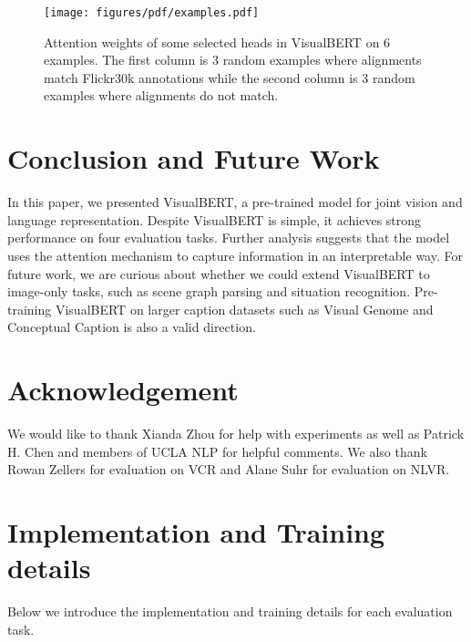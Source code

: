 \documentclass{article} \usepackage{iclr2019_conference,times}
\newcommand{\model}{VisualBERT\xspace}
\newcommand{\nlvr}{NLVR\xspace}
\begin{document}
\begin{figure} [h]
\centering
\vspace{-20pt}
\texttt{[image: figures/pdf/examples.pdf]}
\caption{Attention weights of some selected heads in \model on 6 examples. The first column is 3 random examples where alignments match Flickr30k annotations while the second column is 3 random examples where alignments do not match. }
\label{fig:examples}
\end{figure}
 
\section{Conclusion and Future Work}
In this paper, we presented \model, a pre-trained model for joint vision and language representation. Despite \model is simple, it achieves strong performance on four evaluation tasks. Further analysis suggests that the model uses the attention mechanism to capture information in an interpretable way. For future work, we are curious about whether we could extend \model to image-only tasks, such as scene graph parsing and situation recognition.  Pre-training \model on larger caption datasets such as Visual Genome and Conceptual Caption is also a valid direction.

\section*{Acknowledgement}
We would like to thank Xianda Zhou for help with experiments as well as Patrick H. Chen and members of UCLA NLP for helpful comments. We also thank Rowan Zellers for evaluation on VCR and Alane Suhr for evaluation on \nlvr.
 


\clearpage





\newpage
\appendix
\section*{Implementation and Training details}
Below we introduce the implementation and training details for each evaluation task.
\end{document}
